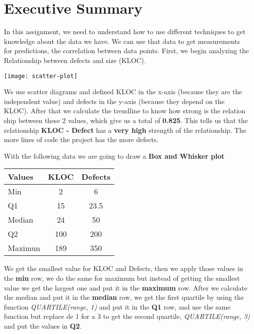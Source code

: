 \section{Executive Summary}
In this assignment, we need to understand how to use different techniques to get knowledge about the data we have. We can use that data to get measurements for predictions, the correlation between data points.
\newline\newline
\noindent
First, we begin analyzing the Relationship between defects and size (KLOC). 
\begin{center}
    \texttt{[image: scatter-plot]}    
\end{center}

\noindent
We use scatter diagrams and defined KLOC in the x-axis (because they are the independent value) and defects in the y-axis (because they depend on the KLOC).
\newline\newline
\noindent
After that we calculate the trendline to know how strong is the relation ship between these 2 values, which give us a total of \textbf{0.825}.
\newline\newline
\noindent
This tells us that the relationship \textbf{KLOC - Defect} has a \textbf{very high} strength of the relationship. The more lines of code the project has the more defects.

\pagebreak
\noindent
With the following data we are going to draw a \textbf{Box and Whisker plot}

\begin{center}
    \begin{tabular}{|p{2.5cm} | c | c|}
        \hline
        Values & \textbf{KLOC} & \textbf{Defects} \\ [0.5ex] 
        \hline
        Min & 2 & 6 \\  
        \hline
        Q1 & 15 & 23.5    \\
        \hline
        Median & 24 & 50 \\
        \hline
        Q2 & 100 & 200  \\  
        \hline
        Maximun & 189 & 350 \\
        \hline
    \end{tabular}
\end{center}

\noindent

We get the smallest value for KLOC and Defects, then we apply those values in the \textbf{min} row, we do the same for maximum but instead of getting the smallest value we get the largest one and put it in the \textbf{maximum} row.
\newline\newline
\noindent
After we calculate the median and put it in the \textbf{median} row, we get the first quartile by using the function \textit{QUARTILE(range, 1)} and put it in the \textbf{Q1} row, and use the same function but replace de 1 for a 3 to get the second quartile, \textit{QUARTILE(range, 3)} and put the values in \textbf{Q2}.

